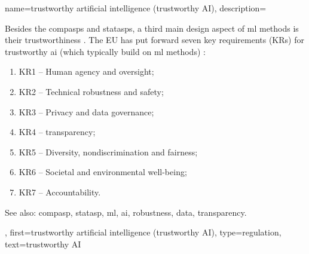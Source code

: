 {name={trustworthy artificial intelligence (trustworthy AI)},
	description={Besides the \glspl{compasp} and \glspl{statasp}, a third main design aspect of 
		\gls{ml} methods is their trustworthiness 
		\cite{pfau2024engineeringtrustworthyaideveloper}. 
		The EU has put forward seven key requirements (KRs) for trustworthy 
		\gls{ai} (which typically build on \gls{ml} methods) \cite{ALTAIEU}: 
		\begin{enumerate}[label=\arabic*)]
			\item KR1 – Human agency and oversight;
			\item KR2 – Technical \gls{robustness} and safety;
			\item KR3 – Privacy and \gls{data} governance;
			\item KR4 – \Gls{transparency};
			\item KR5 – Diversity, nondiscrimination and fairness; 
			\item KR6 – Societal and environmental well-being;
			\item KR7 – Accountability. 
		\end{enumerate}
		See also: \gls{compasp}, \gls{statasp}, \gls{ml}, \gls{ai}, \gls{robustness}, \gls{data}, \gls{transparency}.},
	first={trustworthy artificial intelligence (trustworthy AI)},
	type=regulation,
	text={trustworthy AI}
}




